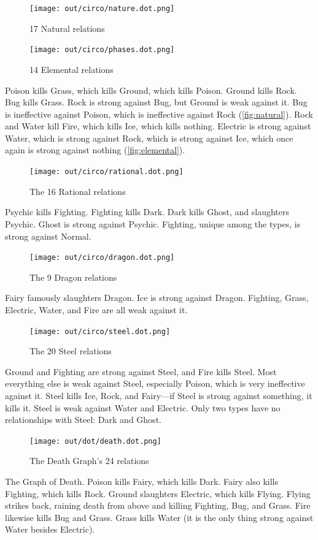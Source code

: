 \begin{figure}[h!]
  \begin{minipage}[t]{0.5\textwidth}
    \texttt{[image: out/circo/nature.dot.png]}
    \caption{17 Natural relations}
    \label{fig:natural}
  \end{minipage}
  \begin{minipage}[t]{0.5\textwidth}
    \texttt{[image: out/circo/phases.dot.png]}
    \caption{14 Elemental relations}
    \label{fig:elemental}
  \end{minipage}
\end{figure}
Poison kills Grass, which kills Ground, which kills Poison.
Ground kills Rock.
Bug kills Grass.
Rock is strong against Bug, but Ground is weak against it.
Bug is ineffective against Poison, which is ineffective against Rock (\autoref{fig:natural}).
Rock and Water kill Fire, which kills Ice, which kills nothing.
Electric is strong against Water, which is strong against Rock, which is strong against Ice,
 which once again is strong against nothing (\autoref{fig:elemental}).

\begin{figure}[ht]
\centering
\texttt{[image: out/circo/rational.dot.png]}
\caption{The 16 Rational relations}
\end{figure}
Psychic kills Fighting.
Fighting kills Dark.
Dark kills Ghost, and slaughters Psychic.
Ghost is strong against Psychic.
Fighting, unique among the types, is strong against Normal.

\begin{figure}
\centering
\texttt{[image: out/circo/dragon.dot.png]}
\caption{The 9 Dragon relations}
\end{figure}
Fairy famously slaughters Dragon.
Ice is strong against Dragon.
Fighting, Grass, Electric, Water, and Fire are all weak against it.

\begin{figure}
\centering
\texttt{[image: out/circo/steel.dot.png]}
\caption{The 20 Steel relations}
\end{figure}
Ground and Fighting are strong against Steel, and Fire kills Steel.
Most everything else is weak against Steel, especially
 Poison, which is very ineffective against it.
Steel kills Ice, Rock, and Fairy---if Steel is strong against something, it kills it.
Steel is weak against Water and Electric.
Only two types have no relationships with Steel: Dark and Ghost.

\begin{figure}[ht]
\centering
\texttt{[image: out/dot/death.dot.png]}
\caption{The Death Graph's 24 relations}
\end{figure}
The Graph of Death.
Poison kills Fairy, which kills Dark.
Fairy also kills Fighting, which kills Rock.
Ground slaughters Electric, which kills Flying.
Flying strikes back, raining death from above and killing Fighting, Bug, and Grass.
Fire likewise kills Bug and Grass.
Grass kills Water (it is the only thing strong against Water besides Electric).

